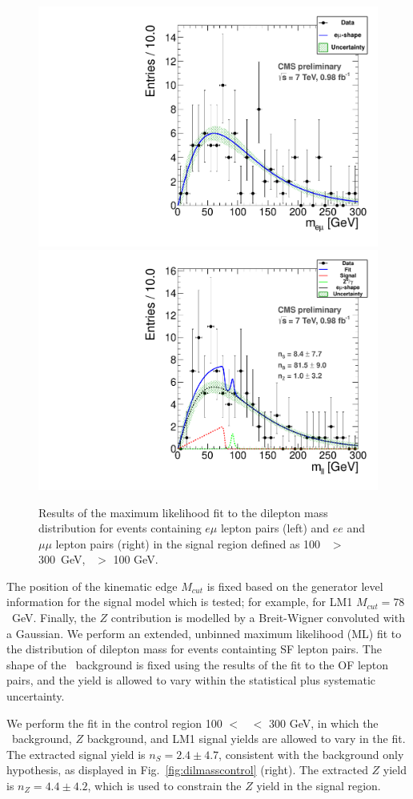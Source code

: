\begin{figure}[hbt]
\begin{center}
\includegraphics[width=0.48\linewidth]{plots_final/fit2011OFOS_Signal_Data.pdf}
\includegraphics[width=0.48\linewidth]{plots_final/fit2011_Signal_Data.pdf}
\caption{\label{fig:dilmass}\protect 
Results of the maximum likelihood fit to the dilepton mass distribution for events containing 
$e\mu$ lepton pairs (left) and $ee$ and $\mu\mu$ lepton pairs (right) in the signal
region defined as 100 \Ht\ $>$ 300~GeV, \MET\ $>$ 100 GeV.
}
\end{center}
\end{figure}

The position of the kinematic edge $M_{cut}$ is fixed based on the generator level
information for the signal model which is tested; for example, for LM1 
$M_{cut} = 78$~GeV. Finally, the $Z$ contribution is modelled by a Breit-Wigner 
convoluted with a Gaussian. We perform an extended, unbinned maximum 
likelihood (ML) fit to the distribution of dilepton mass for events containting SF lepton pairs. 
The shape of the \ttbar\ background is fixed using the results of the fit to the OF lepton pairs,
and the yield is allowed to vary within the 
statistical plus systematic uncertainty. 

We perform the fit in the control region 100 $<$ \Ht\ $<$ 300 GeV, in
which the \ttbar\ background, $Z$ background, and LM1 signal yields are allowed to vary in the fit. 
The extracted signal yield is $n_S = 2.4 \pm 4.7$, consistent with the background only 
hypothesis, as displayed in Fig.~\ref{fig:dilmasscontrol} (right). 
The extracted $Z$ yield is $n_Z = 4.4 \pm 4.2$, which is 
used to constrain the $Z$ yield in the signal region. 

